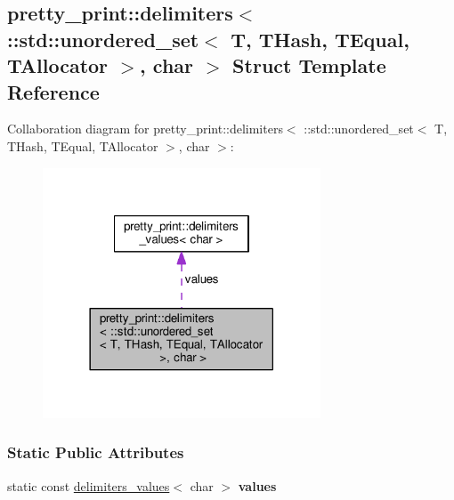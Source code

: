 \hypertarget{structpretty__print_1_1delimiters_3_01_1_1std_1_1unordered__set_3_01T_00_01THash_00_01TEqual_00_9d58038da02264e434f8b08cedf60f18}{}\subsection{pretty\+\_\+print\+:\+:delimiters$<$ \+:\+:std\+:\+:unordered\+\_\+set$<$ T, T\+Hash, T\+Equal, T\+Allocator $>$, char $>$ Struct Template Reference}
\label{structpretty__print_1_1delimiters_3_01_1_1std_1_1unordered__set_3_01T_00_01THash_00_01TEqual_00_9d58038da02264e434f8b08cedf60f18}


Collaboration diagram for pretty\+\_\+print\+:\+:delimiters$<$ \+:\+:std\+:\+:unordered\+\_\+set$<$ T, T\+Hash, T\+Equal, T\+Allocator $>$, char $>$\+:\nopagebreak
\begin{figure}[H]
\begin{center}
\leavevmode
\includegraphics[width=234pt]{structpretty__print_1_1delimiters_3_01_1_1std_1_1unordered__set_3_01T_00_01THash_00_01TEqual_00_d17653090a9f1dfc361653e01ec6112d}
\end{center}
\end{figure}
\subsubsection*{Static Public Attributes}
\begin{DoxyCompactItemize}
\item 
static const \hyperlink{structpretty__print_1_1delimiters__values}{delimiters\+\_\+values}$<$ char $>$ {\bfseries values}\hypertarget{structpretty__print_1_1delimiters_3_01_1_1std_1_1unordered__set_3_01T_00_01THash_00_01TEqual_00_9d58038da02264e434f8b08cedf60f18_a370dbfd78c29f7cfdae8c7f505519eeb}{}\label{structpretty__print_1_1delimiters_3_01_1_1std_1_1unordered__set_3_01T_00_01THash_00_01TEqual_00_9d58038da02264e434f8b08cedf60f18_a370dbfd78c29f7cfdae8c7f505519eeb}

\end{DoxyCompactItemize}


